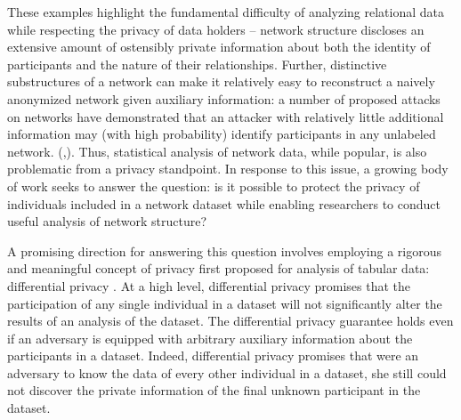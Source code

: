 
These examples highlight the fundamental difficulty of analyzing relational data while respecting the privacy of data holders -- network structure discloses an extensive amount of ostensibly private information about both the identity of participants and the nature of their relationships. Further, distinctive substructures of a network can make it relatively easy to reconstruct a naively anonymized network given auxiliary information: a number of proposed attacks on networks have demonstrated that an attacker with relatively little additional information may (with high probability) identify participants in any unlabeled network. (\cite{BDK11},\cite{NS09}). Thus, statistical analysis of network data, while popular, is also problematic from a privacy standpoint. In response to this issue, a growing body of work seeks to answer the question: is it possible to protect the privacy of individuals included in a network dataset while enabling researchers to conduct useful analysis of network structure?

A promising direction for answering this question involves employing a rigorous and meaningful concept of privacy first proposed for analysis of tabular data: differential privacy \cite{DMNS06}. At a high level, differential privacy promises that the participation of any single individual in a dataset will not significantly alter the results of an analysis of the dataset. The differential privacy guarantee  holds even if an adversary is equipped with arbitrary auxiliary information about the participants in a dataset. Indeed, differential privacy promises that were an adversary to know the data of every other individual in a dataset, she still could not discover the private information of the final unknown participant in the dataset. 

